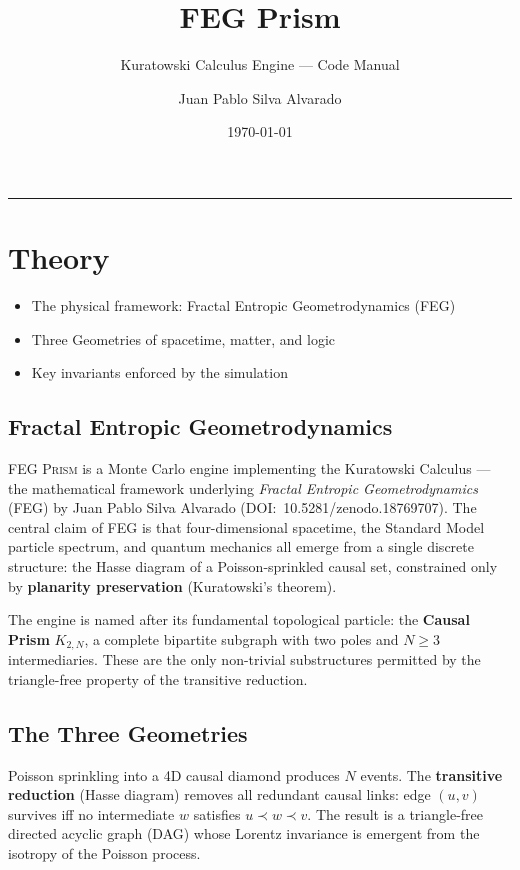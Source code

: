 \documentclass[11pt, a4paper, openany]{book}
\title{FEG Prism}
\subtitle{Kuratowski Calculus Engine --- Code Manual}
\author{Juan Pablo Silva Alvarado}
\date{\today}
\makeatletter
\newenvironment{introduction}[1][Chapter Overview]{%
  \begin{tcolorbox}[
    enhanced,colback=structure!5,colframe=structure,
    colbacktitle=structure,coltitle=white,
    fonttitle=\small\bfseries,title={#1},
    arc=2pt,boxrule=0.7pt,
    left=8pt,right=8pt,top=6pt,bottom=6pt,
    before skip=12pt,after skip=12pt
  ]\itshape\begin{itemize}[leftmargin=*,itemsep=2pt,parsep=0pt]
}{%
  \end{itemize}\end{tcolorbox}
}
\gdef\@subtitle{}\gdef\@extrainfo{}
\renewcommand{\maketitle}{%
  \begin{titlepage}\centering
    \vspace*{4cm}
    {\Huge\bfseries\color{structure}\@title\par}\vspace{0.6cm}
    \ifx\@subtitle\empty\else{\Large\color{gray!80}\@subtitle\par}\fi
    \vspace{2cm}
    {\color{main}\rule{0.6\textwidth}{2pt}\par}\vspace{2cm}
    {\LARGE\@author\par}\vspace{1cm}
    {\large\@date\par}\vfill
    \ifx\@extrainfo\empty\else
      \begin{minipage}{0.8\textwidth}\centering\itshape\color{gray!60}\@extrainfo\end{minipage}\vspace{3cm}
    \fi
  \end{titlepage}
}
\makeatother
\begin{document}
\maketitle
\frontmatter
\tableofcontents
\mainmatter

\chapter{Theory}

\begin{introduction}
  \item The physical framework: Fractal Entropic Geometrodynamics (FEG)
  \item Three Geometries of spacetime, matter, and logic
  \item Key invariants enforced by the simulation
\end{introduction}

\section{Fractal Entropic Geometrodynamics}

\textsc{FEG Prism} is a Monte Carlo engine implementing the Kuratowski Calculus
--- the mathematical framework underlying \emph{Fractal Entropic
Geometrodynamics} (FEG) by Juan Pablo Silva Alvarado
(DOI:~10.5281/zenodo.18769707).  The central claim of FEG is that four-dimensional
spacetime, the Standard Model particle spectrum, and quantum mechanics all emerge
from a single discrete structure: the Hasse diagram of a Poisson-sprinkled causal
set, constrained only by \textbf{planarity preservation} (Kuratowski's theorem).

The engine is named after its fundamental topological particle: the \textbf{Causal
Prism} $K_{2,N}$, a complete bipartite subgraph with two poles and $N \geq 3$
intermediaries.  These are the only non-trivial substructures permitted by the
triangle-free property of the transitive reduction.

\section{The Three Geometries}

\begin{definition}
  Poisson sprinkling into a 4D causal diamond produces $N$ events.  The
  \textbf{transitive reduction} (Hasse diagram) removes all redundant causal
  links: edge $(u,v)$ survives iff no intermediate $w$ satisfies $u \prec w
  \prec v$.  The result is a triangle-free directed acyclic graph (DAG) whose
  Lorentz invariance is emergent from the isotropy of the Poisson process.
\end{definition}
\end{document}
